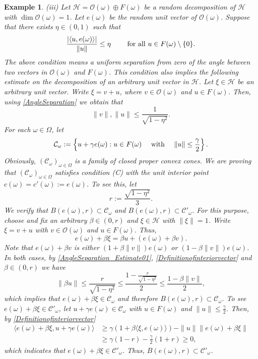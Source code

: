\documentclass[pdflatex,sn-mathphys-num]{sn-jnl}%
\theoremstyle{thmstyleone}%
\theoremstyle{thmstyletwo}%
\newtheorem{example}{Example}%
\theoremstyle{thmstylethree}%
\newcommand{\cH}{\mathcal{H}}
\newcommand{\cC}{\mathcal{C}}
\newcommand{\cO}{\mathcal{O}}
\numberwithin{equation}{section}
\begin{document}
\begin{example}
\noindent 
(iii) Let $\cH=\cO(\omega) \oplus F(\omega)$ be a random decomposition of $\cH$ with $\dim \cO(\omega)=1$. Let $e(\omega)$ be the random unit vector of $\cO(\omega)$. Suppose that there exists $\eta\in (0,1)$ such that 
\begin{equation}\label{AngleSeparation}
\frac{|\langle u,e(\omega)\rangle|}{\|u\|}\leq \eta \qquad\hbox{ for all } u\in F(\omega)\setminus\{0\}. \end{equation}
%
The above condition means a uniform separation from zero of the angle between two vectors in $\cO(\omega)$  and $F(\omega)$. This condition also implies the following estimate on the decomposition of an arbitrary unit vector in $\cH$.  Let $\xi\in\cH$ be an arbitrary unit vector. Write $\xi=v+u$, where $v\in\cO(\omega)$ and $u\in F(\omega)$. Then, using \eqref{AngleSeparation} we obtain that 
\begin{equation}\label{AngleSeparation_Estimate01}
\|v\|, \|u\|\leq \frac{1}{\sqrt{1-\eta^2}}.     
\end{equation}
%
For each $\omega\in\Omega$, let 
\[
\cC_{\omega}:=\left\{ u+\gamma e(\omega): u\in F(\omega)\quad \hbox{ with } \quad  \|u\|\leq \frac{\gamma}{2} \right\}.
 \]
Obviously, $(\mathcal C_{\omega})_{\omega\in\Omega}$ is a family of closed proper convex cones. We are proving that  $(\mathcal C_{\omega})_{\omega\in \Omega}$ satisfies condition (C) with the unit interior point $c(\omega)=c'(\omega):=e(\omega)$. To see this, let
\begin{equation}\label{Definitionofinteriorvector}
r:=\frac{\sqrt{1-\eta^2}}{3 }.   
\end{equation}
We verify that $B(e(\omega),r)\subset \cC_{\omega}$ and $B(e(\omega),r)\subset \cC'_{\omega}$. For this purpose, choose and fix an arbitrary $\beta\in (0,r)$ and $\xi\in \cH$ with $\|\xi\|=1$. Write $\xi=v+u$ with $v\in\cO(\omega)$ and $u\in F(\omega)$. Thus, 
\[
e(\omega)+\beta \xi=
\beta u+ (e(\omega)+\beta v).
\]
Note that $e(\omega)+\beta v$ is either $(1+\beta\|v\|) e(\omega)$ or $(1-\beta\|v\|)e(\omega)$. In both cases, by \eqref{AngleSeparation_Estimate01}, \eqref{Definitionofinteriorvector} and $\beta \in (0,r)$ we have \[
\|\beta u\| \leq \frac{r}{\sqrt{1-\eta^2}}
\leq \frac{1-\frac{r}{\sqrt{1-\eta^2}}}{2}
\leq \frac{1-\beta\|v\|}{2},
\]
which implies that  $e(\omega)+\beta \xi\in \cC_{\omega}$ and therefore $B(e(\omega),r)\subset \cC_{\omega}$. To see $e(\omega)+\beta \xi\in \cC'_{\omega}$, let $u+\gamma e(\omega)\in \cC_{\omega}$ with $u\in F(\omega)$ and $\|u\|\leq \frac{\gamma}{2}$. Then, by \eqref{Definitionofinteriorvector}
\begin{align*}
\langle e(\omega)+\beta \xi, u+\gamma e(\omega)\rangle
& \geq 
\gamma (1+ \beta \langle \xi,e(\omega)\rangle)
-\|u\|\|e(\omega)+\beta \xi\|\\[1ex]
&\geq 
\gamma (1-r)-\frac{\gamma}{2}(1+r)\geq 0,
\end{align*}
which indicates that $e(\omega)+\beta \xi\in \cC'_{\omega}$. Thus, $B(e(\omega),r)\subset \cC'_{\omega}$.
\end{example}
\end{document}
